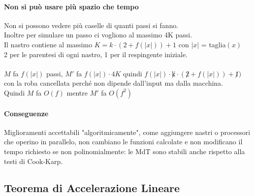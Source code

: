 \documentclass[10pt]{book}
\begin{document}
\paragraph{Non si può usare più spazio che tempo} Non si possono vedere più caselle di quanti passi si fanno.\\ Inoltre per simulare un passo ci vogliono al massimo 4K passi.\\
Il nastro contiene al massimo $K = k\cdot (2 + f(|x|)) + 1$ con $|x|$ = taglia$(x)$\\
2 per le parentesi di ogni nastro, 1 per il respingente iniziale.\\\\
$M$ fa $f(|x|)$ passi, $M'$ fa $f(|x|) \cdot 4K$ quindi $f(|x|) \cdot \not k \cdot (\not 2 + f(|x|)) + \not 1)$ con la roba cancellata perché non dipende dall'input ma dalla macchina.\\
Quindi $M$ fa $O(f)$ mentre $M'$ fa $O(f^2)$
\paragraph{Conseguenze} Miglioramenti accettabili "algoritmicamente", come aggiungere nastri o processori che operino in parallelo, non cambiano le funzioni calcolate e non modificano il tempo richiesto se non polinomialmente: le MdT sono stabili anche rispetto alla testi di Cook-Karp.
\subsection{Teorema di Accelerazione Lineare}
\end{document}
